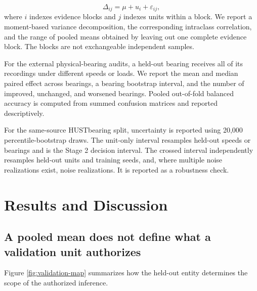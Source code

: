 \documentclass[11pt]{article}
\begin{document}
\begin{equation}
\Delta_{ij}=\mu+u_i+\varepsilon_{ij},
\label{eq:evidence-block}
\end{equation}
where $i$ indexes evidence blocks and $j$ indexes units within a block. We
report a moment-based variance decomposition, the corresponding intraclass
correlation, and the range of pooled means obtained by leaving out one complete
evidence block. The blocks are not exchangeable independent samples.

For the external physical-bearing audits, a held-out bearing receives all of
its recordings under different speeds or loads. We report the mean and median
paired effect across bearings, a bearing bootstrap interval, and the number of
improved, unchanged, and worsened bearings. Pooled out-of-fold balanced
accuracy is computed from summed confusion matrices and reported descriptively.

For the same-source HUSTbearing split, uncertainty is reported using 20,000
percentile-bootstrap draws. The unit-only interval resamples held-out speeds or
bearings and is the Stage 2 decision interval. The crossed interval
independently resamples held-out units and training seeds, and, where multiple
noise realizations exist, noise realizations. It is reported as a robustness
check.

\section{Results and Discussion}

\subsection{A pooled mean does not define what a validation unit authorizes}

Figure \ref{fig:validation-map} summarizes how the held-out entity determines
the scope of the authorized inference.
\end{document}

